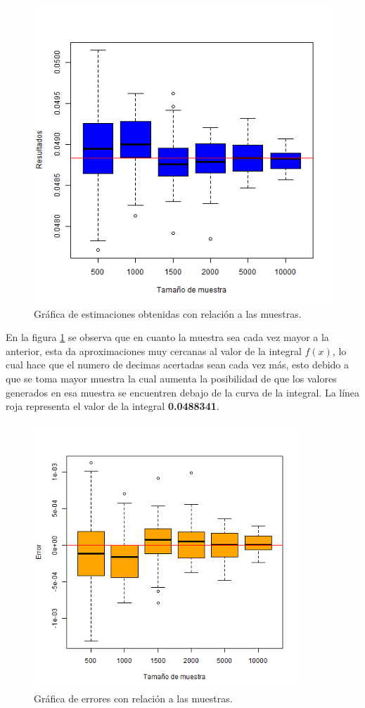 \documentclass{article}
\begin{document}
\begin{figure}[h!]
\centering\includegraphics[width=120mm]{aproximacion.png}
\caption{Gr\'afica de estimaciones obtenidas con relaci\'on a las muestras.}
\label{fig:aprox}
\end{figure}

En la figura \ref{fig:aprox} se observa que en cuanto la muestra sea cada vez mayor a la anterior, esta da aproximaciones muy cercanas al valor de la integral $f(x)$, lo cual hace que el numero de decimas acertadas sean cada vez m\'as, esto debido a que se toma mayor muestra la cual aumenta la posibilidad de que los valores generados en esa muestra se encuentren debajo de la curva de la integral.
La l\'inea roja representa el valor de la integral \textbf{0.0488341}.

\newpage

\begin{figure}[h!]
\centering\includegraphics[width=100mm]{error.png}
\caption{Gr\'afica de errores con relaci\'on a las muestras.}
\label{fig:error}
\end{figure}
\end{document}
